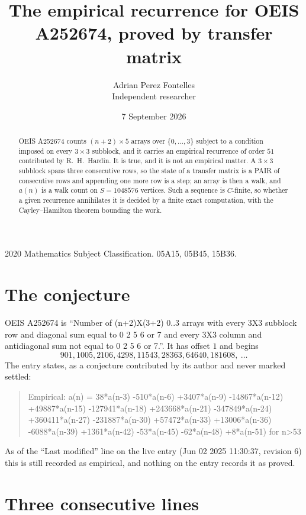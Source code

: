 \documentclass[11pt,a4paper]{article}
\title{The empirical recurrence for OEIS A252674, proved by transfer matrix}
\author{Adrian Perez Fontelles\\ \small Independent researcher}
\date{7 September 2026}
\theoremstyle{plain}
\theoremstyle{definition}
\begin{document}
\maketitle

\begin{abstract}
OEIS A252674 counts $(n+2)\times5$ arrays over $\{0,\dots,3\}$ subject to a condition imposed on
every $3\times3$ subblock, and it carries an empirical recurrence of order $51$
contributed by R.~H.~Hardin. It is true, and it is not an empirical matter. A $3\times3$
subblock spans three consecutive rows, so the state of a transfer matrix is a PAIR of
consecutive rows and appending one more row is a step; an array is then a walk, and
$a(n)$ is a walk count on $S=1048576$ vertices. Such a sequence is $C$-finite, so whether a given
recurrence annihilates it is decided by a finite exact computation, with the Cayley--Hamilton
theorem bounding the work.
\end{abstract}

\noindent\small 2020 Mathematics Subject Classification. 05A15, 05B45, 15B36.\normalsize

\section{The conjecture}

OEIS A252674 is ``Number of (n+2)X(3+2) 0..3 arrays with every 3X3 subblock row and diagonal sum equal to 0 2 5 6 or 7 and every 3X3 column and antidiagonal sum not equal to 0 2 5 6 or 7.''. It has offset $1$ and begins
\[
901, 1005, 2106, 4298, 11543, 28363, 64640, 181608,\ \dots
\]
The entry states, as a conjecture contributed by its author and never marked settled:
\begin{quote}
Empirical: a(n) = 38*a(n-3) -510*a(n-6) +3407*a(n-9) -14867*a(n-12) +49887*a(n-15) -127941*a(n-18) +243668*a(n-21) -347849*a(n-24) +360411*a(n-27) -231887*a(n-30) +57472*a(n-33) +13006*a(n-36) -6088*a(n-39) +1361*a(n-42) -53*a(n-45) -62*a(n-48) +8*a(n-51) for n>53
\end{quote}
As of the ``Last modified'' line on the live entry (Jun 02 2025 11:30:37, revision 6) this is still
recorded as empirical, and nothing on the entry records it as proved.

\section{Three consecutive lines}
\end{document}

